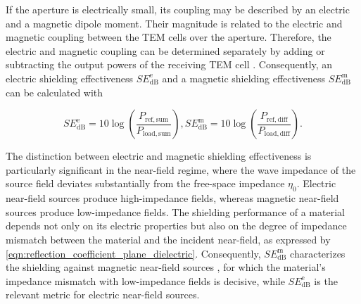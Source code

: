 If the aperture is electrically small, its coupling may be described by an electric and a magnetic dipole moment. Their magnitude is related to the electric and magnetic coupling between the TEM cells over the aperture. Therefore, the electric and magnetic coupling can be determined separately by adding or subtracting the output powers of the receiving TEM cell \cite{MORARI_BĂLAN_2015, 4091811}. Consequently, an electric shielding effectiveness $SE_\mathrm{dB}^\mathrm{e}$ and a magnetic shielding effectiveness $SE_\mathrm{dB}^\mathrm{m}$ can be calculated with

\begin{subequations}
	\begin{equation}
		SE_\mathrm{dB}^\mathrm{e}=10\log{\left( \frac{P_\mathrm{ref, sum}}{P_\mathrm{load,sum}} \right)},
		\label{eqn:se_dual_cell_e}
	\end{equation}
	\begin{equation}
		SE_\mathrm{dB}^\mathrm{m}=10\log{\left( \frac{P_\mathrm{ref, diff}}{P_\mathrm{load,diff}} \right)}.
		\label{eqn:se_dual_cell_m}
	\end{equation}
\end{subequations}

The distinction between electric and magnetic shielding effectiveness is particularly 
significant in the near-field regime, where the wave impedance of the source field 
deviates substantially from the free-space impedance $\eta_0$. Electric near-field 
sources produce high-impedance fields, whereas magnetic near-field sources produce 
low-impedance fields. The shielding performance of a material depends not only on its electric properties but also on the degree of impedance mismatch between the material and the incident near-field, as expressed by \eqref{eqn:reflection_coefficient_plane_dielectric}. Consequently, $SE_\mathrm{dB}^\mathrm{m}$ characterizes the shielding against magnetic near-field sources  \cite{4091811}, for which the material's impedance mismatch with low-impedance fields is decisive, while $SE_\mathrm{dB}^\mathrm{e}$ is the relevant metric for electric near-field sources. 





